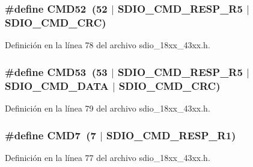 \subsubsection[{\texorpdfstring{C\+M\+D52}{CMD52}}]{\setlength{\rightskip}{0pt plus 5cm}\#define C\+M\+D52~(52 $\vert$ {\bf S\+D\+I\+O\+\_\+\+C\+M\+D\+\_\+\+R\+E\+S\+P\+\_\+\+R5} $\vert$ {\bf S\+D\+I\+O\+\_\+\+C\+M\+D\+\_\+\+C\+RC})}\hypertarget{group___s_d_i_o__18_x_x__43_x_x_gaf9a0a4575ef1e94446e8ef6d69120081}{}\label{group___s_d_i_o__18_x_x__43_x_x_gaf9a0a4575ef1e94446e8ef6d69120081}


Definición en la línea 78 del archivo sdio\+\_\+18xx\+\_\+43xx.\+h.

\subsubsection[{\texorpdfstring{C\+M\+D53}{CMD53}}]{\setlength{\rightskip}{0pt plus 5cm}\#define C\+M\+D53~(53 $\vert$ {\bf S\+D\+I\+O\+\_\+\+C\+M\+D\+\_\+\+R\+E\+S\+P\+\_\+\+R5} $\vert$ {\bf S\+D\+I\+O\+\_\+\+C\+M\+D\+\_\+\+D\+A\+TA} $\vert$ {\bf S\+D\+I\+O\+\_\+\+C\+M\+D\+\_\+\+C\+RC})}\hypertarget{group___s_d_i_o__18_x_x__43_x_x_gaa2da002d132a2f8393b9b17e080f7b28}{}\label{group___s_d_i_o__18_x_x__43_x_x_gaa2da002d132a2f8393b9b17e080f7b28}


Definición en la línea 79 del archivo sdio\+\_\+18xx\+\_\+43xx.\+h.

\subsubsection[{\texorpdfstring{C\+M\+D7}{CMD7}}]{\setlength{\rightskip}{0pt plus 5cm}\#define C\+M\+D7~(7 $\vert$ {\bf S\+D\+I\+O\+\_\+\+C\+M\+D\+\_\+\+R\+E\+S\+P\+\_\+\+R1})}\hypertarget{group___s_d_i_o__18_x_x__43_x_x_ga8d3c60653ad9483b8f3d276cc838a3c9}{}\label{group___s_d_i_o__18_x_x__43_x_x_ga8d3c60653ad9483b8f3d276cc838a3c9}


Definición en la línea 77 del archivo sdio\+\_\+18xx\+\_\+43xx.\+h.

